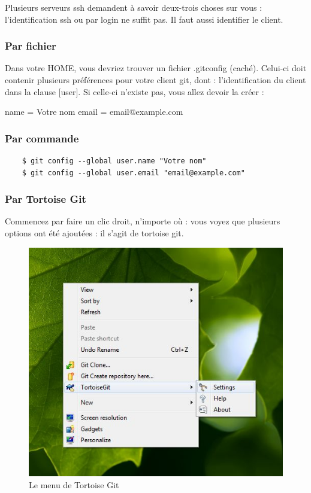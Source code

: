 Plusieurs serveurs ssh demandent à savoir deux-trois choses sur vous : l'identification ssh ou par login
ne suffit pas. Il faut aussi identifier le client.

\subsubsection{Par fichier}

Dans votre HOME, vous devriez trouver un fichier .gitconfig (caché).
Celui-ci doit contenir plusieurs préférences pour votre client git, dont : l'identification du client dans la clause [user].
Si celle-ci n'existe pas, vous allez devoir la créer :

\begin{verbatimtab}[4]
[user]
	name = Votre nom
	email = email@example.com

\end{verbatimtab}

\subsubsection{Par commande}

\begin{verbatim}
	$ git config --global user.name "Votre nom"
	$ git config --global user.email "email@example.com"
\end{verbatim}
\newpage
\subsubsection{Par Tortoise Git}
Commencez par faire un clic droit, n'importe où : vous voyez que plusieurs options ont été ajoutées : il s'agit de tortoise git.

\begin{figure}[h] 
	\begin{center}
		\includegraphics[scale=0.5]{../IMG/settingsTG.jpg}
	\end{center}
	\caption{Le menu de Tortoise Git}
	\label{Le menu de Tortoise Git} 
\end{figure}

